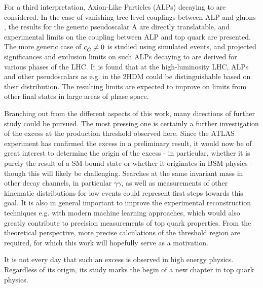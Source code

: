 For a third interpretation, Axion-Like Particles (ALPs) decaying to \ttbar are considered. In the case of vanishing tree-level couplings between ALP and gluons \cG, the results for the generic pseudoscalar A are directly translatable, and experimental limits on the coupling between ALP and top quark are presented. The more generic case of $c_{\tilde{G}} \neq 0$ is studied using simulated events, and projected significances and exclusion limits on such ALPs decaying to \ttbar are derived for various phases of the LHC. It is found that at the high-luminosity LHC, ALPs and other pseudoscalars as e.g. in the 2HDM could be distinguishable based on their \mtt distribution. The resulting limits are expected to improve on limits from other final states in large areas of phase space.

\smallskip

Branching out from the different aspects of this work, many directions of further study could be pursued. The most pressing one is certainly a further investigation of the excess at the \ttbar production threshold observed here. Since the ATLAS experiment has confirmed the excess in a preliminary result, it would now be of great interest to determine the origin of the excess - in particular, whether it is purely the result of a SM bound state or whether it originates in BSM physics - though this will likely be challenging. Searches at the same invariant mass in other decay channels, in particular $\gamma\gamma$, as well as measurements of other kinematic distributions for low \mtt events could represent first steps towards this goal. It is also in general important to improve the experimental \ttbar reconstruction techniques e.g. with modern machine learning approaches, which would also greatly contribute to precision measurements of top quark properties. From the theoretical perspective, more precise calculations of the \ttbar threshold region are required, for which this work will hopefully serve as a motivation.

It is not every day that such an excess is observed in high energy physics. Regardless of its origin, its study marks the begin of a new chapter in top quark physics.

